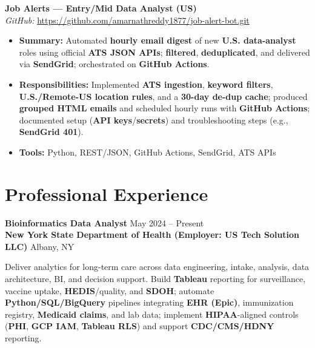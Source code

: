 \documentclass[9.5pt]{article}
\begin{document}
\textbf{Job Alerts — Entry/Mid Data Analyst (US)} \\
\textit{GitHub:} \url{https://github.com/amarnathreddy1877/job-alert-bot.git}

\begin{itemize}[leftmargin=*]
  \item \textbf{Summary:} Automated \textbf{hourly email digest} of new \textbf{U.S. data-analyst} roles using official \textbf{ATS JSON APIs}; \textbf{filtered}, \textbf{deduplicated}, and delivered via \textbf{SendGrid}; orchestrated on \textbf{GitHub Actions}.
  \item \textbf{Responsibilities:} Implemented \textbf{ATS ingestion}, \textbf{keyword filters}, \textbf{U.S./Remote-US location rules}, and a \textbf{30-day de-dup cache}; produced \textbf{grouped HTML emails} and scheduled hourly runs with \textbf{GitHub Actions}; documented setup (\textbf{API keys}/\textbf{secrets}) and troubleshooting steps (e.g., \textbf{SendGrid 401}).
  \item \textbf{Tools:} Python, REST/JSON, GitHub Actions, SendGrid, ATS APIs
\end{itemize}


\section*{Professional Experience}

\textbf{Bioinformatics Data Analyst} \hfill May 2024 -- Present\\
\textbf{New York State Department of Health (Employer: US Tech Solution LLC)} \hfill Albany, NY

Deliver analytics for long-term care across data engineering, intake, analysis, data architecture, BI, and decision support. Build \textbf{Tableau} reporting for surveillance, vaccine uptake, \textbf{HEDIS}/quality, and \textbf{SDOH}; automate \textbf{Python/SQL/BigQuery} pipelines integrating \textbf{EHR (Epic)}, immunization registry, \textbf{Medicaid claims}, and lab data; implement \textbf{HIPAA}-aligned controls (\textbf{PHI}, \textbf{GCP IAM}, \textbf{Tableau RLS}) and support \textbf{CDC/CMS/HDNY} reporting.
\end{document}
